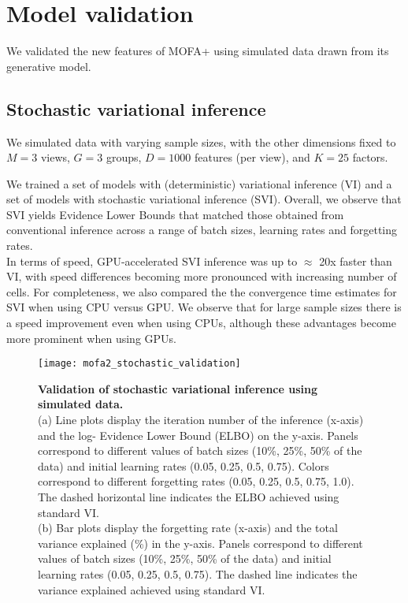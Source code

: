 \graphicspath{{Chapter4/Figs/simulations/}{Chapter4/Figs/scrna/}{Chapter4/Figs/scmet/}{Chapter4/Figs/scnmt/}}

\section{Model validation}

We validated the new features of MOFA+ using simulated data drawn from its generative model.

\subsection{Stochastic variational inference}

We simulated data with varying sample sizes, with the other dimensions fixed to $M=3$ views, $G=3$ groups, $D=1000$ features (per view), and $K=25$ factors.

We trained a set of models with (deterministic) variational inference (VI) and a set of models with stochastic variational inference (SVI). Overall, we observe that SVI yields Evidence Lower Bounds that matched those obtained from conventional inference across a range of batch sizes, learning rates and forgetting rates.\\
In terms of speed, GPU-accelerated SVI inference was up to $\approx$ 20x faster than VI, with speed differences becoming more pronounced with increasing number of cells. For completeness, we also compared the the convergence time estimates for SVI when using CPU versus GPU. We observe that for large sample sizes there is a speed improvement even when using CPUs, although these advantages become more prominent when using GPUs.

\begin{figure}[H]
	\centering
	\texttt{[image: mofa2\_stochastic\_validation]}
	\caption[]{
	\textbf{Validation of stochastic variational inference using simulated data.} \\
	(a) Line plots display the iteration number of the inference (x-axis) and the log- Evidence Lower Bound (ELBO) on the y-axis. Panels correspond to different values of batch sizes (10\%, 25\%, 50\% of the data) and initial learning rates (0.05, 0.25, 0.5, 0.75). Colors correspond to different forgetting rates (0.05, 0.25, 0.5, 0.75, 1.0). The dashed horizontal line indicates the ELBO achieved using standard VI. \\
	(b) Bar plots display the forgetting rate (x-axis) and the total variance explained (\%) in the y-axis. Panels correspond to different values of batch sizes (10\%, 25\%, 50\% of the data) and initial learning rates (0.05, 0.25, 0.5, 0.75). The dashed line indicates the variance explained achieved using standard VI. 
	}
	\label{fig:mofa2_stochastic_validation}
\end{figure}

